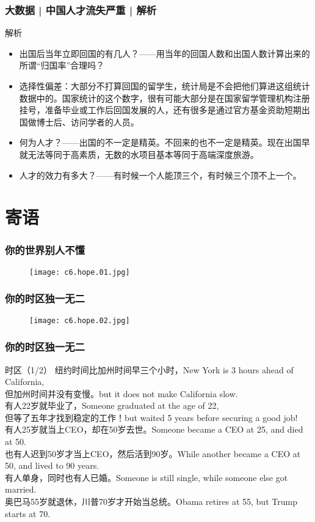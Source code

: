 \begin{frame}
  \frametitle{大数据 | 中国人才流失严重 | 解析}
  \begin{block}{解析}
    \begin{itemize}
      \item 出国后当年立即回国的有几人？——用当年的回国人数和出国人数计算出来的所谓“归国率”合理吗？
      \item 选择性偏差：大部分不打算回国的留学生，统计局是不会把他们算进这组统计数据中的。国家统计的这个数字，很有可能大部分是在国家留学管理机构注册挂号，准备毕业或工作后回国发展的人，还有很多是通过官方基金资助短期出国做博士后、访问学者的人员。
      \item 何为人才？——出国的不一定是精英。不回来的也不一定是精英。现在出国早就无法等同于高素质，无数的水项目基本等同于高端深度旅游。
      \item 人才的效力有多大？——有时候一个人能顶三个，有时候三个顶不上一个。
    \end{itemize}
  \end{block}
\end{frame}

\section{寄语}
\begin{frame}
  \frametitle{你的世界别人不懂}
  \begin{figure}
    \centering
    \texttt{[image: c6.hope.01.jpg]}
  \end{figure}
\end{frame}

\begin{frame}
  \frametitle{你的时区独一无二}
  \begin{figure}
    \centering
    \texttt{[image: c6.hope.02.jpg]}
  \end{figure}
\end{frame}

\begin{frame}
  \frametitle{你的时区独一无二}
  \begin{block}{时区（1/2）}
纽约时间比加州时间早三个小时，New York is 3 hours ahead of California,\\
但加州时间并没有变慢。but it does not make California slow.\\
有人22岁就毕业了，Someone graduated at the age of 22,\\
但等了五年才找到稳定的工作！but waited 5 years before securing a good job!\\
有人25岁就当上CEO，却在50岁去世。Someone became a CEO at 25, and died at 50.\\
也有人迟到50岁才当上CEO，然后活到90岁。While another became a CEO at 50, and lived to 90 years.\\
有人单身，同时也有人已婚。Someone is still single, while someone else got married.\\
奥巴马55岁就退休，川普70岁才开始当总统。Obama retires at 55, but Trump starts at 70.\\
  \end{block}
\end{frame}

